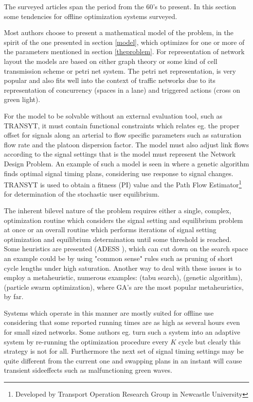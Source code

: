 The surveyed articles span the period from the 60's to present. In this section some tendencies for offline optimization systems surveyed.

Most authors choose to present a mathematical model of the problem, in the spirit of the one presented in section \ref{model}, which optimizes for one or more of the parameters mentioned in section \ref{theproblem}. For representation of network layout the models are based on either graph theory or some kind of cell transmission scheme or petri net system. The petri net representation, \cite{petri} is very popular and also fits well into the context of traffic networks due to its representation of concurrency (spaces in a lane) and triggered actions (cross on green light).

For the model to be solvable without an external evaluation tool, such as TRANSYT, it must contain functional constraints which relates eg. the proper offset for signals along an arterial to flow specific parameters such as saturation flow rate and the platoon dispersion factor.
The model must also adjust link flows according to the signal settings that is the model must represent the Network Design Problem. An example of such a model is seen in \cite{33} where a genetic algorithm finds optimal signal timing plans, considering use response to signal changes. TRANSYT is used to obtain a fitness (PI) value and the Path Flow Estimator\footnote{Developed by Transport Operation Research Group in Newcastle University} for determination of the stochastic user equilibrium.

The inherent bilevel nature of the problem requires either a single, complex, optimization routine which considers the signal setting and equilibrium problem at once or an overall routine which performs iterations of signal setting optimization and equilibrium determination until some threshold is reached. 
Some heuristics are presented (ADESS \cite{26}), which can cut down on the search space an example could be by using "common sense" rules such as pruning of short cycle lengths under high saturation.
Another way to deal with these issues is to employ a metaheuristic, numerous examples: \cite{1} (tabu search), \cite{7} (genetic algorithm), \cite{42} (particle swarm optimization), where GA's are the most popular metaheuristics, by far.

Systems which operate in this manner are mostly suited for offline use considering that some reported running times are as high as several hours even for small sized networks.
Some authors eg. \cite{16} turn such a system into an adaptive system by re-running the optimization procedure every $K$ cycle but clearly this strategy is not for all. Furthermore the next set of signal timing settings may be quite different from the current one and swapping plans in an instant will cause transient sideeffects such as malfunctioning green waves.


